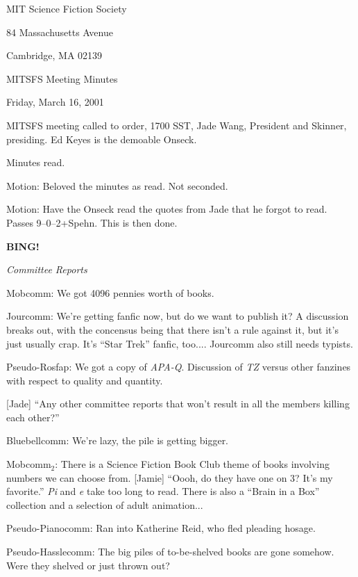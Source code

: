 \documentclass[12pt]{article}
\newcommand{\bing}{{\bf BING!} }
\newcommand{\goto}[1]{\bing \vskip 12pt \centerline{{\em{#1}}}}
\begin{document}
\begin{center}

MIT Science Fiction Society 

84 Massachusetts Avenue

Cambridge, MA 02139

\vspace{12pt}

MITSFS Meeting Minutes 

Friday, March 16, 2001

\end{center}
 
\vspace{18pt}

\setlength{\parskip}{6pt}

\noindent
MITSFS meeting called to order, 1700 SST, Jade Wang, President and
Skinner, presiding.  Ed Keyes is the demoable Onseck.

Minutes read.

Motion: Beloved the minutes as read.  Not seconded.

Motion: Have the Onseck read the quotes from Jade that he forgot
to read.  Passes 9--0--2+Spehn.  This is then done.

\goto{Committee Reports}

Mobcomm: We got 4096 pennies worth of books.

Jourcomm: We're getting fanfic now, but do we want to publish it?
A discussion breaks out, with the concensus being that there isn't
a rule against it, but it's just usually crap.  It's ``Star Trek''
fanfic, too....  Jourcomm also still needs typists.

Pseudo-Rosfap: We got a copy of {\em APA-Q}.  Discussion of {\em TZ}
versus other fanzines with respect to quality and quantity.

[Jade] ``Any other committee reports that won't result in all the
members killing each other?''

Bluebellcomm: We're lazy, the pile is getting bigger.

Mobcomm$_2$: There is a Science Fiction Book Club theme of books
involving numbers we can choose from.  [Jamie] ``Oooh, do they have
one on 3?  It's my favorite.''  {\em Pi} and {\em e} take too long
to read.  There is also a ``Brain in a Box'' collection and a
selection of adult animation...

Pseudo-Pianocomm: Ran into Katherine Reid, who fled pleading hosage.

Pseudo-Hasslecomm: The big piles of to-be-shelved books are gone
somehow.  Were they shelved or just thrown out?
\end{document}
